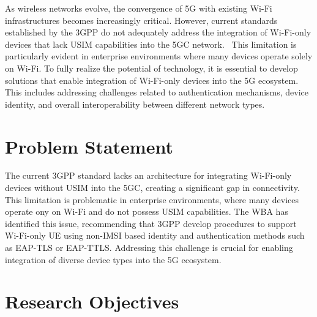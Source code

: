 
As wireless networks evolve, the convergence of 5G with existing Wi-Fi infrastructures becomes increasingly critical. However, current standards established by the \ac{3GPP} do not adequately address the integration of Wi-Fi-only devices that lack \ac{USIM} capabilities into the \ac{5GC} network.~\cite{wba-04-2021-p59} This limitation is particularly evident in enterprise environments where many devices operate solely on Wi-Fi. To fully realize the potential of  technology, it is essential to develop solutions that enable integration of Wi-Fi-only devices into the \ac{5G} ecosystem. This includes addressing challenges related to authentication mechanisms, device identity, and overall interoperability between different network types.

\section{Problem Statement}


The current \ac{3GPP} standard lacks an architecture for integrating Wi-Fi-only devices without \ac{USIM} into the \acl{5GC}, creating a significant gap in connectivity. This limitation is problematic in enterprise environments, where many devices operate ony on Wi-Fi and do not possess \ac{USIM} capabilities. The \ac{WBA} has identified this issue, recommending that \ac{3GPP} develop procedures to support Wi-Fi-only \ac{UE} using non-\acs{IMSI} based identity and authentication methods such as \ac{EAP-TLS} or \ac{EAP-TTLS}. Addressing this challenge is crucial for enabling integration of diverse device types into the \ac{5G} ecosystem.

\section{Research Objectives}

